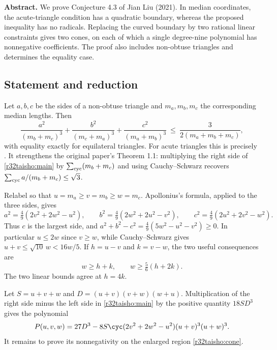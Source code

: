 \documentclass[11pt,a4paper]{article}
\numberwithin{equation}{section}
\theoremstyle{definition}
\theoremstyle{remark}
\begin{document}
\textbf{Abstract.} We prove Conjecture 4.3 of Jian Liu (2021). In median coordinates, the acute-triangle condition has a quadratic boundary, whereas the proposed inequality has no radicals. Replacing the curved boundary by two rational linear constraints gives two cones, on each of which a single degree-nine polynomial has nonnegative coefficients. The proof also includes non-obtuse triangles and determines the equality case.

\subsection*{Statement and reduction}
Let $a,b,c$ be the sides of a non-obtuse triangle and $m_a,m_b,m_c$ the corresponding median lengths. Then
\begin{equation}
 \frac{a^2}{(m_b+m_c)^3}+\frac{b^2}{(m_c+m_a)^3}
 +\frac{c^2}{(m_a+m_b)^3}
 \ \le\ \frac3{2(m_a+m_b+m_c)}, \label{r32taisho:main}
\end{equation}
with equality exactly for equilateral triangles. For acute triangles this is precisely \cite[Conjecture 4.3, (66)]{r32taisho:liu}. It strengthens the original paper's Theorem 1.1: multiplying the right side of \eqref{r32taisho:main} by $\sum_{\rm cyc}(m_b+m_c)$ and using Cauchy--Schwarz recovers $\sum_{\rm cyc}a/(m_b+m_c)\le\sqrt3$.

Relabel so that $u=m_a\ge v=m_b\ge w=m_c$. Apollonius's formula, applied to the three sides, gives
\[
 a^2=\tfrac49(2v^2+2w^2-u^2),\qquad
 b^2=\tfrac49(2w^2+2u^2-v^2),\qquad
 c^2=\tfrac49(2u^2+2v^2-w^2).
\]
Thus $c$ is the largest side, and $a^2+b^2-c^2=\tfrac49(5w^2-u^2-v^2)\ge0$.
In particular $u\le2w$ since $v\ge w$, while Cauchy--Schwarz gives $u+v\le\sqrt{10}\,w<16w/5$. If $h=u-v$ and $k=v-w$, the two useful consequences are
\begin{equation}
 w\ge h+k,\qquad w\ge\tfrac56(h+2k). \label{r32taisho:cone}
\end{equation}
The two linear bounds agree at $h=4k$.

Let $S=u+v+w$ and $D=(u+v)(v+w)(w+u)$. Multiplication of the right side minus the left side in \eqref{r32taisho:main} by the positive quantity $18SD^3$ gives the polynomial
\begin{equation}
 P(u,v,w)=27 D^3-8S\cyc(2v^2+2w^2-u^2)(u+v)^3(u+w)^3 .\label{r32taisho:poly}
\end{equation}
It remains to prove its nonnegativity on the enlarged region \eqref{r32taisho:cone}.
\end{document}

